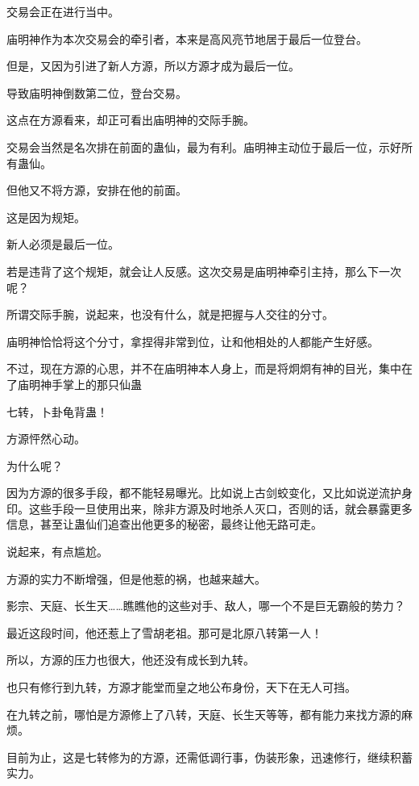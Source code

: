 
\begin{this_body}



交易会正在进行当中。

庙明神作为本次交易会的牵引者，本来是高风亮节地居于最后一位登台。

但是，又因为引进了新人方源，所以方源才成为最后一位。

导致庙明神倒数第二位，登台交易。

这点在方源看来，却正可看出庙明神的交际手腕。

交易会当然是名次排在前面的蛊仙，最为有利。庙明神主动位于最后一位，示好所有蛊仙。

但他又不将方源，安排在他的前面。

这是因为规矩。

新人必须是最后一位。

若是违背了这个规矩，就会让人反感。这次交易是庙明神牵引主持，那么下一次呢？

所谓交际手腕，说起来，也没有什么，就是把握与人交往的分寸。

庙明神恰恰将这个分寸，拿捏得非常到位，让和他相处的人都能产生好感。

不过，现在方源的心思，并不在庙明神本人身上，而是将炯炯有神的目光，集中在了庙明神手掌上的那只仙蛊

七转，卜卦龟背蛊！

方源怦然心动。

为什么呢？

因为方源的很多手段，都不能轻易曝光。比如说上古剑蛟变化，又比如说逆流护身印。这些手段一旦使用出来，除非方源及时地杀人灭口，否则的话，就会暴露更多信息，甚至让蛊仙们追查出他更多的秘密，最终让他无路可走。

说起来，有点尴尬。

方源的实力不断增强，但是他惹的祸，也越来越大。

影宗、天庭、长生天……瞧瞧他的这些对手、敌人，哪一个不是巨无霸般的势力？

最近这段时间，他还惹上了雪胡老祖。那可是北原八转第一人！

所以，方源的压力也很大，他还没有成长到九转。

也只有修行到九转，方源才能堂而皇之地公布身份，天下在无人可挡。

在九转之前，哪怕是方源修上了八转，天庭、长生天等等，都有能力来找方源的麻烦。

目前为止，这是七转修为的方源，还需低调行事，伪装形象，迅速修行，继续积蓄实力。


\end{this_body}
